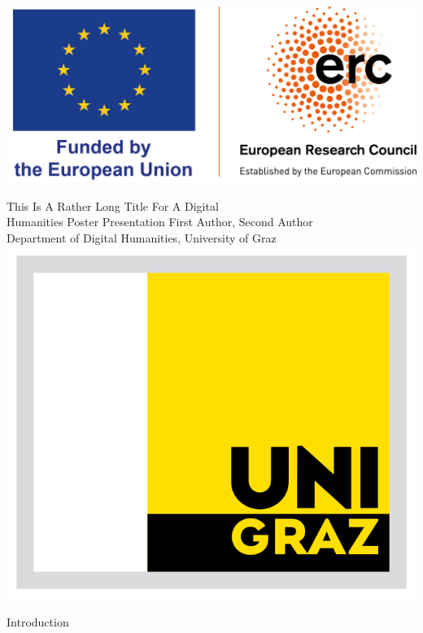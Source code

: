\documentclass[a0paper,portrait]{baposter}
\begin{document}
\begin{poster}
{\begin{minipage}{.125\linewidth}
	\includegraphics[width=\linewidth]{logo_erc-flag_eu.png}
\end{minipage}}
{
	\textsf{This Is A Rather Long Title For A Digital\\ 
	Humanities Poster Presentation}
}
{
\sf\vspace{.2em}
First Author, Second Author\\
\vspace{.2em}
{\small Department of Digital Humanities, University of Graz}
}
{
\includegraphics[width=.125\linewidth]{unigraz_logo.png} %
}

\begin{posterbox}[name=introduction,column=0,row=0, span=3]{Introduction}
	\small
    \lipsum*[19]
	\vspace{1em}


\end{posterbox}
\end{poster}
\end{document}
